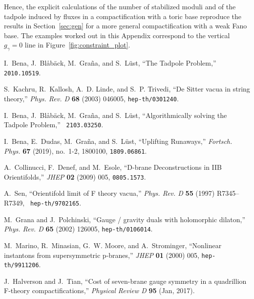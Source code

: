\documentclass[a4paper,12pt]{article}
\numberwithin{equation}{section}
\newcommand{\fref}[1]{Figure~\ref{#1}}
\newcommand{\crv}{\gamma}			%
\begin{document}
Hence, the explicit calculations of the number of stabilized moduli and of the tadpole induced by fluxes in a compactification with a toric base reproduce the results in Section~\ref{sec:gen} for a more general compactification with a weak Fano base.
The examples worked out in this Appendix correspond to the vertical $g_\crv=0$ line in \fref{fig:constraint_plot}.

\providecommand{\href}[2]{#2}\begingroup\raggedright\begin{thebibliography}{10}

I.~Bena, J.~Bl\r{a}b\"ack, M.~Gra\~na, and S.~L\"ust, ``{The Tadpole
  Problem},'' \href{http://arXiv.org/abs/2010.10519}{{\tt 2010.10519}}.

S.~Kachru, R.~Kallosh, A.~D. Linde, and S.~P. Trivedi, ``{De Sitter vacua in
  string theory},'' {\em Phys. Rev. D} {\bf 68} (2003) 046005,
  \href{http://arXiv.org/abs/hep-th/0301240}{{\tt hep-th/0301240}}.

I.~Bena, J.~Bl\r{a}b\"ack, M.~Gra\~na, and S.~L\"ust, ``{Algorithmically
  solving the Tadpole Problem},'' \href{http://arXiv.org/abs/2103.03250}{{\tt
  2103.03250}}.

I.~Bena, E.~Dudas, M.~Graña, and S.~Lüst, ``{Uplifting Runaways},'' {\em
  Fortsch. Phys.} {\bf 67} (2019), no.~1-2, 1800100,
  \href{http://arXiv.org/abs/1809.06861}{{\tt 1809.06861}}.

A.~Collinucci, F.~Denef, and M.~Esole, ``{D-brane Deconstructions in IIB
  Orientifolds},'' {\em JHEP} {\bf 02} (2009) 005,
  \href{http://arXiv.org/abs/0805.1573}{{\tt 0805.1573}}.

A.~Sen, ``{Orientifold limit of F theory vacua},'' {\em Phys. Rev. D} {\bf 55}
  (1997) R7345--R7349, \href{http://arXiv.org/abs/hep-th/9702165}{{\tt
  hep-th/9702165}}.

M.~Grana and J.~Polchinski, ``{Gauge / gravity duals with holomorphic
  dilaton},'' {\em Phys. Rev. D} {\bf 65} (2002) 126005,
  \href{http://arXiv.org/abs/hep-th/0106014}{{\tt hep-th/0106014}}.

M.~Marino, R.~Minasian, G.~W. Moore, and A.~Strominger, ``{Nonlinear instantons
  from supersymmetric p-branes},'' {\em JHEP} {\bf 01} (2000) 005,
  \href{http://arXiv.org/abs/hep-th/9911206}{{\tt hep-th/9911206}}.

J.~Halverson and J.~Tian, ``Cost of seven-brane gauge symmetry in a quadrillion
  F-theory compactifications,'' {\em Physical Review D} {\bf 95} (Jan, 2017).


\end{thebibliography}
\end{document}
